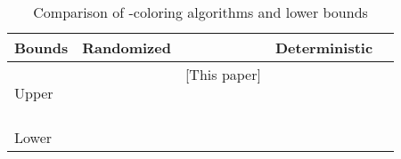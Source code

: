 \documentclass[11pt]{amsart}
\begin{document}
\begin{table*}
\centering
\begin{tabular}{|l | l r |l r | }    \hline
   Bounds  & Randomized & & Deterministic &\\ \hline
    \multirow{ 8}{*}{Upper} &  & [This paper]  &  & \cite{FraigniaudHK15}  \\ \cline{2-5}& & \cite{BEPS16} &  & \cite{bar15a}  \\ \cline{2-5}&  &\cite{Sch10}  &   & \cite{BEK09}  \\ \cline{2-5}& & \cite{lub86,alon86,Joh99} &    & \cite{Kuhn2006On} \\ \cline{2-5}& & &  & \cite{linial92, GPS88} \\ \cline{4-5}
    & & &  & \cite{GPS88} \\ \cline{4-5}& & &   & \cite{GP87} \\ \cline{4-5}&  &    &  & \cite{panc92}   \\ \hline
    \hline
    Lower&  & \cite{Noar91} &  & \cite{linial92}   \\ \hline
  \end{tabular}
\caption{Comparison of -coloring algorithms and lower bounds} \label{ResultsOverview}
\vspace{-5mm}
\end{table*}
\end{document}
